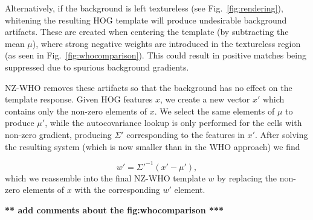 \documentclass[10pt,twocolumn,letterpaper]{article}
\newcommand{\scream}[1]{{\color{red} \bf *** #1 ***}}
\begin{document}
Alternatively, if the background is left textureless (see
Fig.~\ref{fig:rendering}), whitening the resulting HOG template
will produce undesirable background artifacts. These are created when centering
the template (by subtracting the mean $\mu$), where strong negative weights are
introduced in the textureless region (as seen in Fig.~\ref{fig:whocomparison}).
This could result in positive matches being suppressed due to spurious
background gradients.

NZ-WHO removes these artifacts so that the background has no effect on the
template response. Given HOG features $x$, we create a new vector $x'$ which
contains only the non-zero elements of $x$. We select the same elements of
$\mu$ to produce $\mu'$, while the autocovariance lookup is only performed for
the cells with non-zero gradient, producing $\Sigma'$ corresponding to the
features in $x'$. After solving the resulting system (which is now smaller than
in the WHO approach) we find

\begin{equation}
w'=\Sigma'^{-1}(x' - \mu') \label{eq:nz-who},
\end{equation}which we reassemble into the final NZ-WHO template $w$ by
replacing the non-zero elements of $x$ with the corresponding $w'$ element.



\scream{add comments about the fig:whocomparison}
\end{document}
